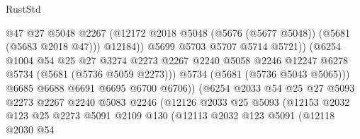 \begin{lexlean}{RustStd}
\begin{coremodule}
                                      @47
                                      @27
                                      @5048
                                      @2267
                                      (@12172
                                        @2018
                                        @5048
                                        (@5676 (@5677 @5048))
                                        (@5681 (@5683 @2018 @47)))
                                      @12184))
                                  @5699
                                  @5703
                                  @5707
                                  @5714
                                  @5721))
                              (@6254
                                @1004
                                @54
                                @25
                                @27
                                @3274
                                @2273
                                @2267
                                @2240
                                @5058
                                @2246
                                @12247
                                @6278
                                @5734
                                (@5681 (@5736 @5059 @2273)))
                              @5734
                              (@5681 (@5736 @5043 @5065)))
                            @6685
                            @6688
                            @6691
                            @6695
                            @6700
                            @6706))
                        (@6254
                          @2033
                          @54
                          @25
                          @27
                          @5093
                          @2273
                          @2267
                          @2240
                          @5083
                          @2246
                          (@12126
                            @2033
                            @25
                            @5093
                            (@12153
                              @2032
                              @123
                              @25
                              @2273
                              @5091
                              @2109
                              @130
                              (@12113
                                @2032
                                @123
                                @5091
                                (@12118
                                  @2030
                                  @54

\end{coremodule}
\end{lexlean}
